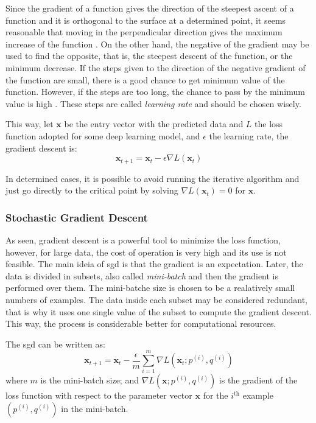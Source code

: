 Since the gradient of a function gives the direction of the steepest ascent of a function and it is orthogonal to the surface at a determined point, it seems reasonable that moving in the perpendicular direction gives the maximum increase of the function \citep{stewart2016}.
On the other hand, the negative of the gradient may be used to find the opposite, that is, the steepest descent of the function, or the minimum decrease.
If the steps given to the direction of the negative gradient of the function are small, there is a good chance to get minimum value of the function.
However, if the steps are too long, the chance to pass by the minimum value is high \citep{nielsen2015}.
These steps are called \emph{learning rate} and should be chosen wisely.

This way, let \(\symbf{x}\) be the entry vector with the predicted data and \(L\) the loss function adopted for some deep learning model, and \(\epsilon\) the learning rate, the gradient descent is:
%
\begin{equation}
    \symbf{x}_{t+1} = \symbf{x}_t - \epsilon \nabla L(\symbf{x}_t)
\end{equation}

In determined cases, it is possible to avoid running the iterative algorithm and just go directly to the critical point by solving \(\nabla L(\symbf{x}_t) = 0\) for \(\symbf{x}\).

\subsubsection*{Stochastic Gradient Descent}

As seen, gradient descent is a powerful tool to minimize the loss function, however, for large data, the cost of operation is very high and its use is not feasible. 
The main ideia of \gls*{sgd} is that the gradient is an expectation.
Later, the data is divided in subsets, also called \emph{mini-batch} and then the gradient is performed over them.
The mini-batche size is chosen to be a realatively small numbers of examples.
The data inside each subset may be considered redundant, that is why it uses one single value of the subset to compute the gradient descent.
This way, the process is considerable better for computational resources.

The \gls*{sgd} can be written as:
%
\begin{equation}
    \symbf{x}_{t+1} = \symbf{x}_t - \frac{\epsilon}{m} \sum_{i=1}^m \nabla L(\symbf{x}_t; p^{(i)},q^{(i)})
\end{equation}
%
where \(m\)  is the mini-batch size; and \(\nabla L(\symbf{x}; p^{(i)}, q^{(i)})\) is the gradient of the loss function with respect to the parameter vector \(\symbf{x}\) for the \(i^{\text{th}}\) example \((p^{(i)}, q^{(i)})\) in the mini-batch.

